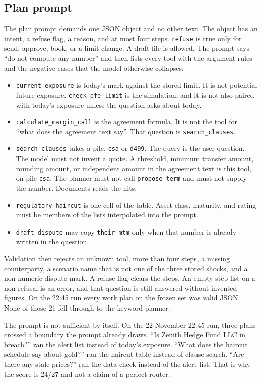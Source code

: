 \documentclass[11pt,a4paper]{article}
\begin{document}
\subsection{Plan prompt}

The plan prompt demands one JSON object and no other text. The object has an intent, a refuse flag, a reason, and at most four steps. \texttt{refuse} is true only for send, approve, book, or a limit change. A draft file is allowed. The prompt says ``do not compute any number'' and then lists every tool with the argument rules and the negative cases that the model otherwise collapses:

\begin{itemize}
  \item \texttt{current\_exposure} is today's mark against the stored limit. It is not potential future exposure. \texttt{check\_pfe\_limit} is the simulation, and it is not also paired with today's exposure unless the question asks about today.
  \item \texttt{calculate\_margin\_call} is the agreement formula. It is not the tool for ``what does the agreement text say''. That question is \texttt{search\_clauses}.
  \item \texttt{search\_clauses} takes a pile, \texttt{csa} or \texttt{d499}. The query is the user question. The model must not invent a quote. A threshold, minimum transfer amount, rounding amount, or independent amount in the agreement text is this tool, on pile \texttt{csa}. The planner must not call \texttt{propose\_term} and must not supply the number. Documents reads the hits.
  \item \texttt{regulatory\_haircut} is one cell of the table. Asset class, maturity, and rating must be members of the lists interpolated into the prompt.
  \item \texttt{draft\_dispute} may copy \texttt{their\_mtm} only when that number is already written in the question.
\end{itemize}

Validation then rejects an unknown tool, more than four steps, a missing counterparty, a scenario name that is not one of the three stored shocks, and a non-numeric dispute mark. A refuse flag clears the steps. An empty step list on a non-refusal is an error, and that question is still answered without invented figures. On the 22:45 run every work plan on the frozen set was valid JSON. None of those 21 fell through to the keyword planner.

The prompt is not sufficient by itself. On the 22 November 22:45 run, three plans crossed a boundary the prompt already draws. ``Is Zenith Hedge Fund LLC in breach?'' ran the alert list instead of today's exposure. ``What does the haircut schedule say about gold?'' ran the haircut table instead of clause search. ``Are there any stale prices?'' ran the data check instead of the alert list. That is why the score is 24/27 and not a claim of a perfect router.
\end{document}
